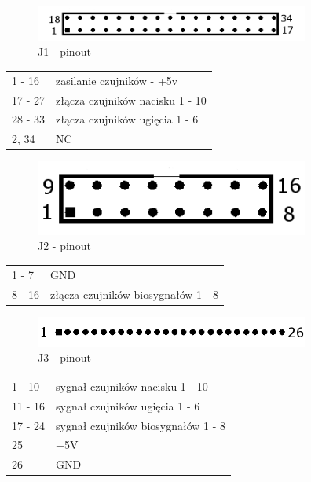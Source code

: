 \documentclass{article}
\begin{document}
\begin{figure}[H]
	\centering
	\includegraphics[width=9cm]{J1.png}
	\caption{J1 - pinout}
	\label{rys:J1 - pinout}
\end{figure}

\begin{table}[H]
	\centering
	\label{J1 - pinout}
	\begin{tabular}{ll}
	1 - 16		&	zasilanie czujników - +5v		\\
	17 - 27		&	złącza czujników nacisku 1 - 10		\\
	28 - 33		&	złącza czujników ugięcia 1 - 6		\\
	2, 34		&	NC					\\
\end{tabular}
\end{table}

\begin{figure}[H]
	\centering
	\includegraphics[width=9cm]{J2.png}
	\caption{J2 - pinout}
	\label{rys:J2 - pinout}
\end{figure}

\begin{table}[H]
	\centering
	\label{J2 - pinout}
	\begin{tabular}{ll}
	1 - 7		&	GND					\\
	8 - 16		&	złącza czujników biosygnałów 1 - 8	\\
\end{tabular}
\end{table}

\begin{figure}[H]
	\centering
	\includegraphics[width=9cm]{J3.png}
	\caption{J3 - pinout}
	\label{rys:J3 - pinout}
\end{figure}

\begin{table}[H]
	\centering
	\label{J3 - pinout}
	\begin{tabular}{ll}
	1 - 10		&	sygnał czujników nacisku 1 - 10		\\
	11 - 16		&	sygnał czujników ugięcia 1 - 6		\\
	17 - 24		&	sygnał czujników biosygnałów 1 - 8	\\
	25		&	+5V					\\
	26		&	GND					\\
\end{tabular}
\end{table}
\end{document}
